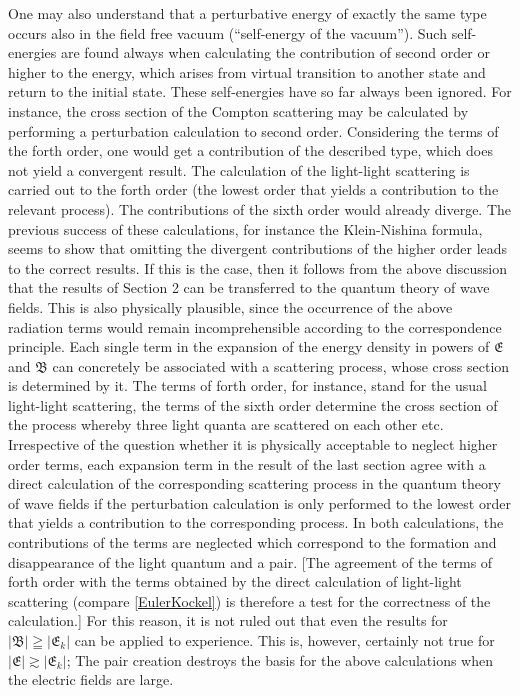 \documentclass{article}
\begin{document}
One may also understand that a perturbative energy of exactly the same type occurs also in the field free vacuum
(``self-energy of the vacuum''). Such self-energies are found always when calculating the contribution
of second order or higher to the energy, which arises from virtual transition to another state and return to
the initial state. These self-energies have so far always been ignored. For instance, the cross
section of the
Compton scattering may be calculated by performing a perturbation calculation to second order. Considering
the terms of the forth order, one would get a contribution of the described type, which does not yield a
convergent result. The calculation of the light-light scattering is carried out to the forth order
(the lowest order that yields a contribution to the relevant process). The contributions of the sixth order
would already diverge. The previous success of these calculations, for instance the Klein-Nishina formula, seems
to show that omitting the divergent contributions of the higher order leads to the correct results. If this is
the case, then it follows from the above discussion that the results of Section 2 can be transferred to the
quantum theory of wave fields. This is also physically plausible, since the occurrence of the above radiation
terms would remain incomprehensible according to the correspondence principle. Each single term in the expansion
of the energy density in powers of $ \mathfrak{E}$ and $ \mathfrak{B}$ can concretely be associated with a
scattering process, whose cross section is determined by it. The terms of forth order, for instance, stand for
the usual light-light scattering, the terms of the sixth order determine the cross
section of the process
whereby three light quanta are scattered on each other etc. Irrespective of the question whether it is physically
acceptable to neglect higher order terms, each expansion term in the result of the last
section agree with a direct
calculation of the corresponding scattering process in the quantum theory of wave fields if the perturbation
calculation is only performed to the lowest order that yields a contribution to the corresponding process.
In both calculations, the contributions of the terms are neglected which correspond to the formation and
disappearance of the light quantum and a pair. [The agreement of the terms of forth order with the terms obtained
by the direct calculation of light-light scattering (compare \ref{EulerKockel}) is therefore a test for the
correctness of the calculation.]
For this reason, it is not ruled out that even the results for $|\mathfrak{B}| \geqq  |\mathfrak{E} _k| $
can be applied to experience. This is, however, certainly not true for $|\mathfrak{E}| \gtrsim  |\mathfrak{E} _k| $;
The pair creation destroys the basis for the above calculations when the electric fields are large.
\end{document}

